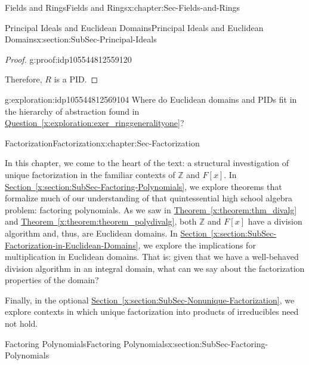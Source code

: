\documentclass[oneside,10pt,]{book}
\newcommand{\xreffont}{\relax}
\numberwithin{equation}{section}
\def\Z{{\mathbb Z}}
\begin{document}
\begin{chapterptx}{Fields and Rings}{}{Fields and Rings}{}{}{x:chapter:Sec-Fields-and-Rings}
\begin{sectionptx}{Principal Ideals and Euclidean Domains}{}{Principal Ideals and Euclidean Domains}{}{}{x:section:SubSec-Principal-Ideals}
\begin{proof}{}{g:proof:idp105544812559120}
\par
Therefore, \(R\) is a PID.%
\end{proof}
\begin{exploration}{}{g:exploration:idp105544812569104}%
Where do Euclidean domains and PIDs fit in the hierarchy of abstraction found in \hyperref[x:exploration:exer_ringgeneralityone]{Question~{\xreffont\ref{x:exploration:exer_ringgeneralityone}}}?%
\end{exploration}%
\end{sectionptx}
\end{chapterptx}
%
%
\typeout{************************************************}
\typeout{************************************************}
%
\begin{chapterptx}{Factorization}{}{Factorization}{}{}{x:chapter:Sec-Factorization}
\begin{introduction}{}%
In this chapter, we come to the heart of the text: a structural investigation of unique factorization in the familiar contexts of \(\Z\) and \(F[x]\). In \hyperref[x:section:SubSec-Factoring-Polynomials]{Section~{\xreffont\ref{x:section:SubSec-Factoring-Polynomials}}}, we explore theorems that formalize much of our understanding of that quintessential high school algebra problem: factoring polynomials. As we saw in \hyperref[x:theorem:thm_divalg]{Theorem~{\xreffont\ref{x:theorem:thm_divalg}}} and \hyperref[x:theorem:theorem_polydivalg]{Theorem~{\xreffont\ref{x:theorem:theorem_polydivalg}}}, both \(\Z\) and \(F[x]\) have a division algorithm and, thus, are Euclidean domains. In \hyperref[x:section:SubSec-Factorization-in-Euclidean-Domains]{Section~{\xreffont\ref{x:section:SubSec-Factorization-in-Euclidean-Domains}}}, we explore the implications for multiplication in Euclidean domains. That is: given that we have a well-behaved division algorithm in an integral domain, what can we say about the factorization properties of the domain?%
\par
Finally, in the optional \hyperref[x:section:SubSec-Nonunique-Factorization]{Section~{\xreffont\ref{x:section:SubSec-Nonunique-Factorization}}}, we explore contexts in which unique factorization into products of irreducibles need not hold.%
\end{introduction}%
%
%
\typeout{************************************************}
\typeout{************************************************}
%
\begin{sectionptx}{Factoring Polynomials}{}{Factoring Polynomials}{}{}{x:section:SubSec-Factoring-Polynomials}

\end{sectionptx}
\end{chapterptx}
\end{document}
